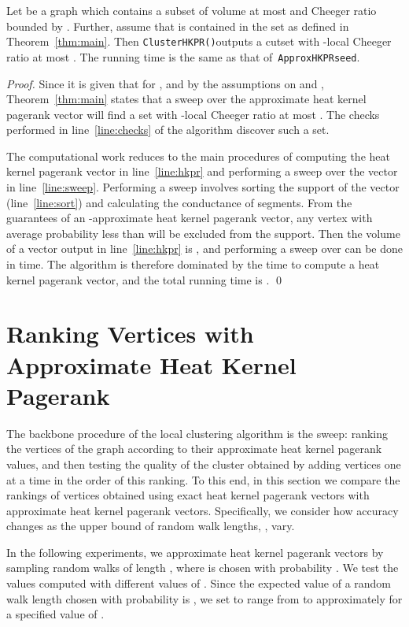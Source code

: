 \documentclass[runningheads,a4paper]{llncs}
\newcommand{\hkprseedalg}{\texttt{ApproxHKPRseed}}
\newcommand{\partitionalgparams}{\texttt{ClusterHKPR()}}
\begin{document}
\begin{theorem}{\label{thm:localpart}}
Let  be a graph which contains a subset  of volume at most 
and Cheeger ratio bounded by .  Further, assume that  is contained in
the set  as defined in Theorem~\ref{thm:main}.  Then
\partitionalgparams outputs a cutset  with -local Cheeger ratio at
most .  The running time is the same as that of~\hkprseedalg.
\end{theorem}

\begin{proof}
Since it is given that  for , and by the assumptions
on  and , Theorem~\ref{thm:main} states that a sweep over the approximate
heat kernel pagerank vector  will find a set with -local
Cheeger ratio at most .  The checks performed in
line~\ref{line:checks} of the algorithm discover such a set.

The computational work reduces to the main procedures of computing the heat
kernel pagerank vector in line~\ref{line:hkpr} and performing a sweep over the
vector in line~\ref{line:sweep}.  Performing a sweep involves sorting the
support of the vector (line~\ref{line:sort}) and calculating the conductance of
segments.  From the guarantees of an -approximate heat kernel pagerank
vector, any vertex with average probability less than  will be
excluded from the support.  Then the volume of a vector  output in
line~\ref{line:hkpr} is , and performing a sweep over
 can be done in  time.  The
algorithm is therefore dominated by the time to compute a heat kernel pagerank
vector, and the total running time is .
\qed\end{proof}


\section{Ranking Vertices with Approximate Heat Kernel Pagerank}
\label{sec:rankings}
The backbone procedure of the local clustering algorithm is the sweep: ranking
the vertices of the graph according to their approximate heat kernel pagerank
values, and then testing the quality of the cluster obtained by adding vertices
one at a time in the order of this ranking.  To this end, in this section we
compare the rankings of vertices obtained using exact heat kernel pagerank
vectors with approximate heat kernel pagerank vectors.  Specifically, we
consider how accuracy changes as the upper bound of random walk lengths, ,
vary.

In the following experiments, we approximate heat kernel pagerank vectors by
sampling random walks of length , where  is chosen with
probability .  We test the values computed with
different values of .  Since the expected value of a random walk length 
chosen with probability  is , we set  to range
from  to approximately  for a specified value of .
\end{document}
